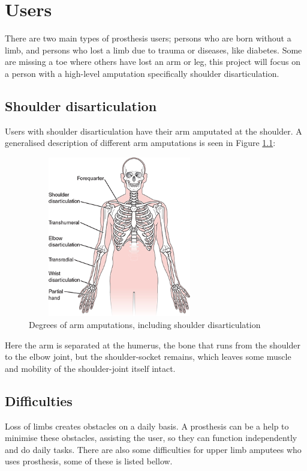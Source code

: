 \chapter{Users}\label{ch:End-User} 
There are two main types of prosthesis users; persons who are born without a limb, and persons who lost a limb due to trauma or diseases, like diabetes\cite{StrainInjuries}. Some are missing a toe where others have lost an arm or leg, this project will focus on a person with a high-level amputation specifically shoulder disarticulation.\\
    
\section{Shoulder disarticulation}
Users with shoulder disarticulation have their arm amputated at the shoulder. A generalised description of different arm amputations is seen in Figure \ref{fig:Degrees_of_amputations}:

\begin{figure}[H]
    \centering
    \includegraphics[width=8cm,height=7cm]{Figures/Contextual_figures/Degrees_of_amputation.png}
    \caption{Degrees of arm amputations, including shoulder disarticulation \cite{Disart}}
    \label{fig:Degrees_of_amputations}
\end{figure}
Here the arm is separated at the humerus, the bone that runs from the shoulder to the elbow joint, but the shoulder-socket remains, which leaves some muscle and mobility of the shoulder-joint itself intact.  

\section{Difficulties} \label{Difficoulties}
Loss of limbs creates obstacles on a daily basis. A prosthesis can be a help to minimise these obstacles, assisting the user, so they can function independently and do daily tasks. There are also some difficulties for upper limb amputees who uses prosthesis, some of these is listed bellow.\\

